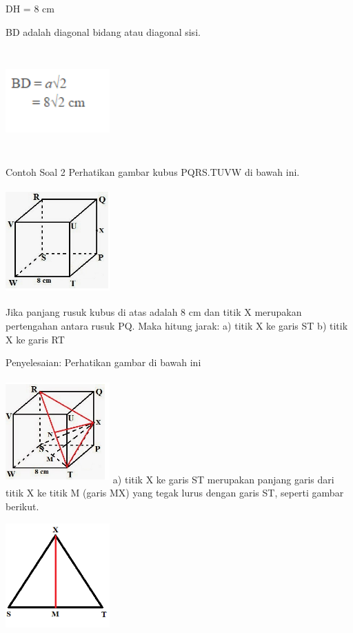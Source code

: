 \documentclass[11pt,fleqn]{book} %
\begin{document}
DH = 8 cm

BD adalah diagonal bidang atau diagonal sisi.


\includegraphics[width = 4cm, height= 4cm]{Pictures/gi9.png}


Contoh Soal 2
Perhatikan gambar kubus PQRS.TUVW di bawah ini.

\includegraphics[width = 4cm, height= 4cm]{Pictures/gi10.png}

Jika panjang rusuk kubus di atas adalah 8 cm dan titik X merupakan pertengahan antara rusuk PQ. Maka hitung jarak:
a) titik X ke garis ST
b) titik X ke garis RT

Penyelesaian:
Perhatikan gambar di bawah ini

\includegraphics[width = 4cm, height= 4cm]{Pictures/gi11.png}
a) titik X ke garis ST merupakan panjang garis dari titik X ke titik M (garis MX) yang tegak lurus dengan garis ST, seperti gambar berikut.

\includegraphics[width = 4cm, height= 4cm]{Pictures/gi12.png}
\end{document}
